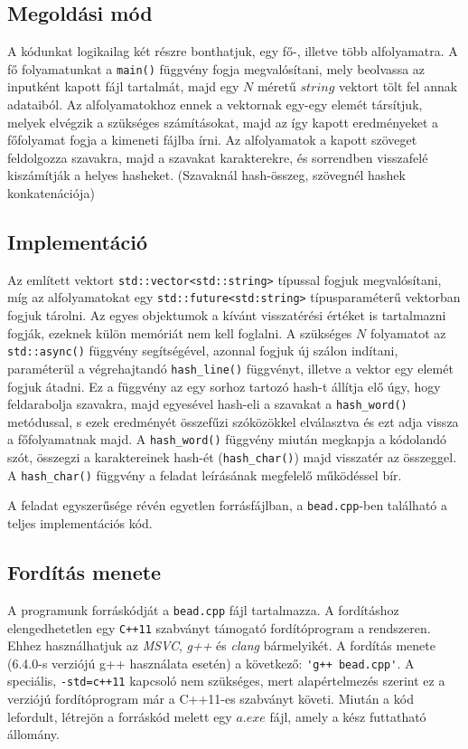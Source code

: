 \documentclass[12pt]{article}
\begin{document}
\subsection{Megoldási mód}

A kódunkat logikailag két részre bonthatjuk, egy fő-, illetve több alfolyamatra. A fő folyamatunkat a \verb|main()| függvény fogja megvalósítani, mely beolvassa az inputként kapott fájl tartalmát, majd egy $N$ méretű $string$ vektort tölt fel annak adataiból. Az alfolyamatokhoz ennek a vektornak egy-egy elemét társítjuk, melyek elvégzik a szükséges számításokat, majd az így kapott eredményeket a főfolyamat fogja a kimeneti fájlba írni.
Az alfolyamatok a kapott szöveget feldolgozza szavakra, majd a szavakat karakterekre, és sorrendben visszafelé kiszámítják a helyes hasheket. (Szavaknál hash-összeg, szövegnél hashek konkatenációja)

\subsection{Implementáció}

Az említett vektort \verb|std::vector<std::string>| típussal fogjuk megvalósítani, míg az alfolyamatokat egy \verb|std::future<std:string>| típusparaméterű vektorban fogjuk tárolni. Az egyes objektumok a kívánt visszatérési értéket is tartalmazni fogják, ezeknek külön memóriát nem kell foglalni. A szükséges $N$ folyamatot az \verb|std::async()| függvény segítségével, azonnal fogjuk új szálon indítani, paraméterül a végrehajtandó \verb|hash_line()| függvényt, illetve a vektor egy elemét fogjuk átadni. Ez a függvény az egy sorhoz tartozó hash-t állítja elő úgy, hogy feldarabolja szavakra, majd egyesével hash-eli a szavakat a \verb|hash_word()| metódussal, s ezek eredményét összefűzi szóközökkel elválasztva és ezt adja vissza a főfolyamatnak majd. A \verb|hash_word()| függvény miután megkapja a kódolandó szót, összegzi a karaktereinek hash-ét (\verb|hash_char()|) majd visszatér az összeggel. A \verb|hash_char()| függvény a feladat leírásának megfelelő működéssel bír.

A feladat egyszerűsége révén egyetlen forrásfájlban, a \verb|bead.cpp|-ben található a teljes implementációs kód.

\subsection{Fordítás menete}

A programunk forráskódját a \verb|bead.cpp| fájl tartalmazza. A fordításhoz elengedhetetlen egy \verb|C++11| szabványt támogató fordítóprogram a rendszeren. Ehhez használhatjuk az \textit{MSVC}, \textit{g++} és \textit{clang} bármelyikét. A fordítás menete (6.4.0-s verziójú g++ használata esetén) a következő: \verb|'g++ bead.cpp'|. A speciális, \verb|-std=c++11| kapcsoló nem szükséges, mert alapértelmezés szerint ez a verziójú fordítóprogram már a C++11-es szabványt követi. Miután a kód lefordult, létrejön a forráskód melett egy $a.exe$ fájl, amely a kész futtatható állomány.
\end{document}
